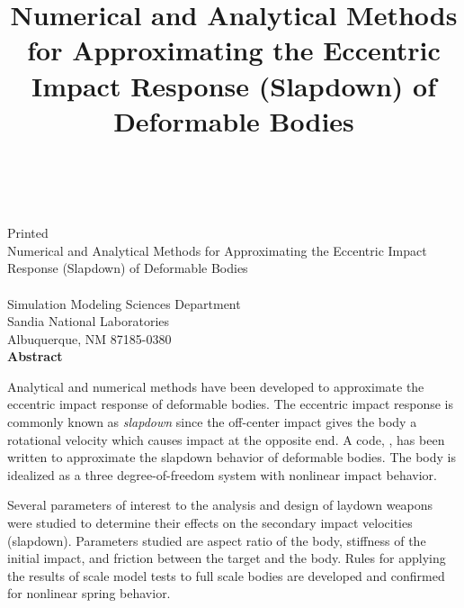 \newif\ifdraft\draftfalse
\newif\ifsand\sandtrue

\SANDprintDate{\today}
\newcommand{\theTitle}{Numerical and Analytical Methods for Approximating the
Eccentric Impact Response (Slapdown) of Deformable Bodies}

\title{\theTitle}
\ifsand
{}
\doCover
\newpage
\else
\SANDmarks{cover}
\setcounter{page}{3}
\fi


\begin{center}
\SANDnumVar\\
\SANDreleaseTypeVar\\
\ifdraft
Draft Date: \SANDprintDateVar\\
\else
Printed \SANDprintDateVar\\
\fi

\vspace{0.75in}
\theTitle\\
\vspace{0.5in}
\SANDauthorVar\\
Simulation Modeling Sciences Department\\
Sandia National Laboratories\\
Albuquerque, NM 87185-0380\\
\vspace*{.4in}
\textbf{Abstract}
\end{center}
\vspace{-.4cm}\par
Analytical and numerical methods have been developed to approximate
the eccentric impact response of deformable bodies.  The eccentric
impact response is commonly known as {\em slapdown} since the
off-center impact gives the body a rotational velocity which causes
impact at the opposite end.  A code, \SLAP , has been written to
approximate the slapdown behavior of deformable bodies. The body is
idealized as a three degree-of-freedom system with nonlinear impact
behavior.

Several parameters of interest to the analysis and design of laydown
weapons were studied to determine their effects on the secondary
impact velocities (slapdown).  Parameters studied are aspect ratio of
the body, stiffness of the initial impact, and friction between the
target and the body. Rules for applying the results of scale model
tests to full scale bodies are developed and confirmed for nonlinear
spring behavior.
